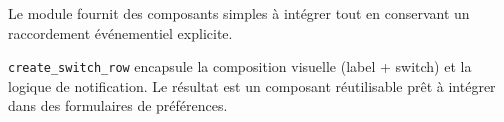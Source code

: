 Le module fournit des composants simples à intégrer tout en conservant un raccordement événementiel explicite.

\texttt{create\_switch\_row} encapsule la composition visuelle (label + switch) et la logique de notification. Le résultat est un composant réutilisable prêt à intégrer dans des formulaires de préférences.

\newpage
